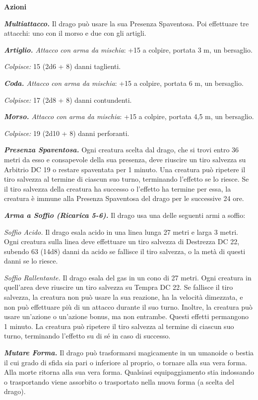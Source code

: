 \begin{multicols}{2}
\smallskip\textbf{Azioni}

\emph{\textbf{Multiattacco.}} Il drago può usare la sua Presenza
Spaventosa. Poi effettuare tre attacchi: uno con il morso e due con gli
artigli.

\emph{\textbf{Artiglio.} Attacco con arma da mischia}: +15 a colpire,
portata 3 m, un bersaglio.

\emph{Colpisce:} 15 (2d6 + 8) danni taglienti.

\emph{\textbf{Coda.} Attacco con arma da mischia}: +15 a colpire,
portata 6 m, un bersaglio.

\emph{Colpisce:} 17 (2d8 + 8) danni contundenti.

\emph{\textbf{Morso.} Attacco con arma da mischia}: +15 a colpire,
portata 4,5 m, un bersaglio.

\emph{Colpisce:} 19 (2d10 + 8) danni perforanti.

\emph{\textbf{Presenza Spaventosa.}} Ogni creatura scelta dal drago, che
si trovi entro 36 metri da esso e consapevole della sua presenza, deve
riuscire un tiro salvezza su Arbitrio DC 19 o restare spaventata per 1
minuto. Una creatura può ripetere il tiro salvezza al termine di ciascun
suo turno, terminando l'effetto se lo riesce. Se il tiro salvezza della
creatura ha successo o l'effetto ha termine per essa, la creatura è
immune alla Presenza Spaventosa del drago per le successive 24 ore.

\emph{\textbf{Arma a Soffio (Ricarica 5-6).}} Il drago usa una delle
seguenti armi a soffio:

\emph{Soffio Acido.} Il drago esala acido in una linea lunga 27 metri e
larga 3 metri. Ogni creatura sulla linea deve effettuare un tiro
salvezza di Destrezza DC 22, subendo 63 (14d8) danni da acido se
fallisce il tiro salvezza, o la metà di questi danni se lo riesce.

\emph{Soffio Rallentante.} Il drago esala del gas in un cono di 27
metri. Ogni creatura in quell'area deve riuscire un tiro salvezza su Tempra DC 22. Se fallisce il tiro salvezza, la creatura non può
usare la sua reazione, ha la velocità dimezzata, e non può effettuare
più di un attacco durante il suo turno. Inoltre, la creatura può usare
un'azione o un'azione bonus, ma non entrambe. Questi effetti permangono
1 minuto. La creatura può ripetere il tiro salvezza al termine di
ciascun suo turno, terminando l'effetto su di sé in caso di successo.

\emph{\textbf{Mutare Forma.}} Il drago può trasformarsi magicamente in
un umanoide o bestia il cui grado di sfida sia pari o inferiore al
proprio, o tornare alla sua vera forma. Alla morte ritorna alla sua vera
forma. Qualsiasi equipaggiamento stia indossando o trasportando viene
assorbito o trasportato nella nuova forma (a scelta del drago).


\end{multicols}

